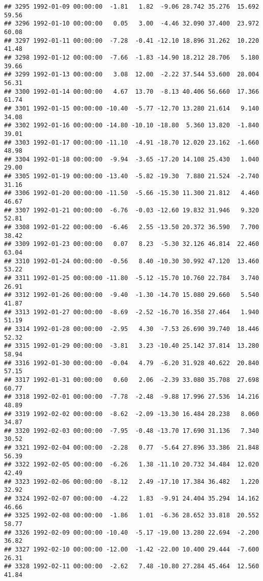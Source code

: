 \documentclass{article}\usepackage{graphicx, color}
\makeatletter
\newenvironment{kframe}{%
 \def\at@end@of@kframe{}%
 \ifinner\ifhmode%
  \def\at@end@of@kframe{\end{minipage}}%
  \begin{minipage}{\columnwidth}%
 \fi\fi%
 \def\FrameCommand##1{\hskip\@totalleftmargin \hskip-\fboxsep
 \colorbox{shadecolor}{##1}\hskip-\fboxsep
     \hskip-\linewidth \hskip-\@totalleftmargin \hskip\columnwidth}%
 \MakeFramed {\advance\hsize-\width
   \@totalleftmargin\z@ \linewidth\hsize
   \@setminipage}}%
 {\par\unskip\endMakeFramed%
 \at@end@of@kframe}
\newenvironment{knitrout}{}{} %
\makeatother
\begin{document}
\begin{knitrout}
\begin{kframe}
\begin{verbatim}
## 3295 1992-01-09 00:00:00  -1.81   1.82  -9.06 28.742 35.276  15.692  59.56
## 3296 1992-01-10 00:00:00   0.05   3.00  -4.46 32.090 37.400  23.972  60.08
## 3297 1992-01-11 00:00:00  -7.28  -0.41 -12.10 18.896 31.262  10.220  41.48
## 3298 1992-01-12 00:00:00  -7.66  -1.83 -14.90 18.212 28.706   5.180  39.66
## 3299 1992-01-13 00:00:00   3.08  12.00  -2.22 37.544 53.600  28.004  56.31
## 3300 1992-01-14 00:00:00   4.67  13.70  -8.13 40.406 56.660  17.366  61.74
## 3301 1992-01-15 00:00:00 -10.40  -5.77 -12.70 13.280 21.614   9.140  34.08
## 3302 1992-01-16 00:00:00 -14.80 -10.10 -18.80  5.360 13.820  -1.840  39.01
## 3303 1992-01-17 00:00:00 -11.10  -4.91 -18.70 12.020 23.162  -1.660  48.98
## 3304 1992-01-18 00:00:00  -9.94  -3.65 -17.20 14.108 25.430   1.040  29.00
## 3305 1992-01-19 00:00:00 -13.40  -5.82 -19.30  7.880 21.524  -2.740  31.16
## 3306 1992-01-20 00:00:00 -11.50  -5.66 -15.30 11.300 21.812   4.460  46.67
## 3307 1992-01-21 00:00:00  -6.76  -0.03 -12.60 19.832 31.946   9.320  52.81
## 3308 1992-01-22 00:00:00  -6.46   2.55 -13.50 20.372 36.590   7.700  38.42
## 3309 1992-01-23 00:00:00   0.07   8.23  -5.30 32.126 46.814  22.460  63.04
## 3310 1992-01-24 00:00:00  -0.56   8.40 -10.30 30.992 47.120  13.460  53.22
## 3311 1992-01-25 00:00:00 -11.80  -5.12 -15.70 10.760 22.784   3.740  26.91
## 3312 1992-01-26 00:00:00  -9.40  -1.30 -14.70 15.080 29.660   5.540  41.87
## 3313 1992-01-27 00:00:00  -8.69  -2.52 -16.70 16.358 27.464   1.940  51.19
## 3314 1992-01-28 00:00:00  -2.95   4.30  -7.53 26.690 39.740  18.446  52.32
## 3315 1992-01-29 00:00:00  -3.81   3.23 -10.40 25.142 37.814  13.280  58.94
## 3316 1992-01-30 00:00:00  -0.04   4.79  -6.20 31.928 40.622  20.840  57.15
## 3317 1992-01-31 00:00:00   0.60   2.06  -2.39 33.080 35.708  27.698  60.77
## 3318 1992-02-01 00:00:00  -7.78  -2.48  -9.88 17.996 27.536  14.216  48.89
## 3319 1992-02-02 00:00:00  -8.62  -2.09 -13.30 16.484 28.238   8.060  34.87
## 3320 1992-02-03 00:00:00  -7.95  -0.48 -13.70 17.690 31.136   7.340  30.52
## 3321 1992-02-04 00:00:00  -2.28   0.77  -5.64 27.896 33.386  21.848  56.39
## 3322 1992-02-05 00:00:00  -6.26   1.38 -11.10 20.732 34.484  12.020  42.49
## 3323 1992-02-06 00:00:00  -8.12   2.49 -17.10 17.384 36.482   1.220  32.92
## 3324 1992-02-07 00:00:00  -4.22   1.83  -9.91 24.404 35.294  14.162  46.66
## 3325 1992-02-08 00:00:00  -1.86   1.01  -6.36 28.652 33.818  20.552  58.77
## 3326 1992-02-09 00:00:00 -10.40  -5.17 -19.00 13.280 22.694  -2.200  36.82
## 3327 1992-02-10 00:00:00 -12.00  -1.42 -22.00 10.400 29.444  -7.600  26.31
## 3328 1992-02-11 00:00:00  -2.62   7.48 -10.80 27.284 45.464  12.560  41.84

\end{verbatim}
\end{kframe}
\end{knitrout}
\end{document}
